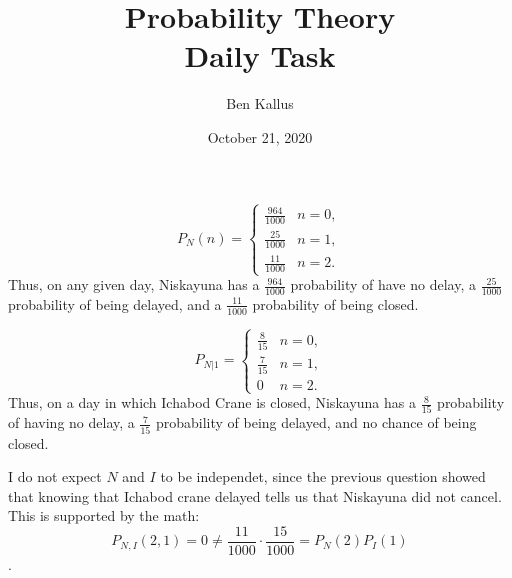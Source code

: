\documentclass[12pt]{article}
\title{Probability Theory \\ Daily Task}
\author{Ben Kallus}
\date{October 21, 2020}
\begin{document}
\maketitle

 $$P_N(n) = \begin{cases} \frac{964}{1000} & n = 0, \\ \frac{25}{1000} & n = 1, \\ \frac{11}{1000} & n = 2. \end{cases}$$ Thus, on any given day, Niskayuna has a $\frac{964}{1000}$ probability of have no delay, a $\frac{25}{1000}$ probability of being delayed, and a $\frac{11}{1000}$ probability of being closed.

\medskip
{} $$P_{N|1} = \begin{cases} \frac{8}{15} & n=0, \\ \frac{7}{15} & n=1, \\ 0 & n=2. \end{cases}$$ Thus, on a day in which Ichabod Crane is closed, Niskayuna has a $\frac{8}{15}$ probability of having no delay, a $\frac{7}{15}$ probability of being delayed, and no chance of being closed.

\medskip
{} I do not expect $N$ and $I$ to be independet, since the previous question showed that knowing that Ichabod crane delayed tells us that Niskayuna did not cancel. This is supported by the math: $$P_{N,I}(2,1) = 0 \neq \frac{11}{1000} \cdot \frac{15}{1000} = P_N(2)P_I(1)$$.
\end{document}
